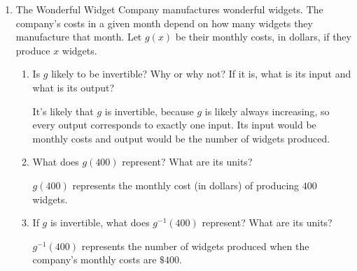 \documentclass{article}
\begin{document}
\begin{enumerate}
\begin{solution}
    To find a formula for the inverse function, we solve $g(y)=x$ for $y$.
    \begin{align*}
      -\frac{5}{y-2}+3 &= x \\
      \frac{5}{y-2} &= 3-x\\
      \frac{5}{3-x} &= y-2 \\
      \frac{5}{3-x} +2 &= y
    \end{align*}
    Thus, $g^{-1}(x) = \dfrac{5}{3-x}+2$.
  \end{solution}

\item  The Wonderful Widget Company manufactures wonderful widgets. The company's costs in a given month depend on how many widgets they manufacture that month. Let $g(x)$ be their monthly costs, in dollars, if they produce $x$ widgets.

  \begin{enumerate}
  \item
    \begin{problem}[\vfill]
      Is $g$ likely to be invertible?  Why or why not? If it is, what is its input and what is its output?
    \end{problem}

    \begin{solution}
      It's likely that $g$ is invertible, because $g$ is likely always
      increasing, so every output corresponds to exactly one input. Its input would be monthly costs and output would be the number of widgets produced.
    \end{solution}

  \item
    \begin{problem}[\vfill]
      What does $g(400)$ represent?  What are its units?
    \end{problem}

    \begin{solution}
      $g(400)$ represents the monthly cost (in dollars) of producing $400$ widgets.
    \end{solution}

  \item
    \begin{problem}[\vfill]
      If $g$ is invertible, what does $g^{-1}(400)$ represent? What are its units?
    \end{problem}

    \begin{solution}
      $g^{-1}(400)$ represents the number of widgets produced when the company's monthly
      costs are $\$400$.
    \end{solution}


\end{enumerate}
\end{enumerate}
\end{document}
